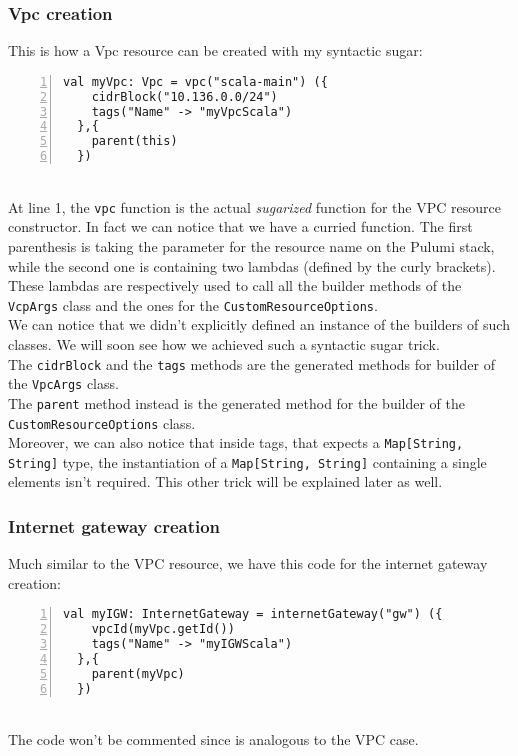 \subsubsection{Vpc creation}
\label{sssec:vpc-creation-scala}
This is how a Vpc resource can be created with my syntactic sugar:
\begin{lstlisting}[numbers=left, numberstyle=\tiny, numbersep=-5pt, stepnumber=1]
  val myVpc: Vpc = vpc("scala-main") ({
    cidrBlock("10.136.0.0/24")
    tags("Name" -> "myVpcScala")
  },{
    parent(this)
  })
\end{lstlisting}\mbox{}\\
At line 1, the \texttt{vpc} function is the actual \textit{sugarized} function for the VPC resource constructor.
In fact we can notice that we have a curried function.
The first parenthesis is taking the parameter for the resource name on the Pulumi stack, while the second one is containing two lambdas (defined by the curly brackets).
These lambdas are respectively used to call all the builder methods of the \texttt{VcpArgs} class and the ones for the \texttt{CustomResourceOptions}.\\
We can notice that we didn't explicitly defined an instance of the builders of such classes.
We will soon see how we achieved such a syntactic sugar trick.\\
The \texttt{cidrBlock} and the \texttt{tags} methods are the generated methods for builder of the \texttt{VpcArgs} class.\\ 
The \texttt{parent} method instead is the generated method for the builder of the \texttt{CustomResourceOptions} class.\\
Moreover, we can also notice that inside tags, that expects a \texttt{Map[String, String]} type, the instantiation of a \texttt{Map[String, String]} containing a single elements isn't required.
This other trick will be explained later as well.

\subsubsection{Internet gateway creation}
Much similar to the VPC resource, we have this code for the internet gateway creation:
\begin{lstlisting}[numbers=left, numberstyle=\tiny, numbersep=-5pt, stepnumber=1]
  val myIGW: InternetGateway = internetGateway("gw") ({
    vpcId(myVpc.getId())
    tags("Name" -> "myIGWScala")
  },{
    parent(myVpc)
  })
\end{lstlisting}\mbox{}\\
The code won't be commented since is analogous to the VPC case.

